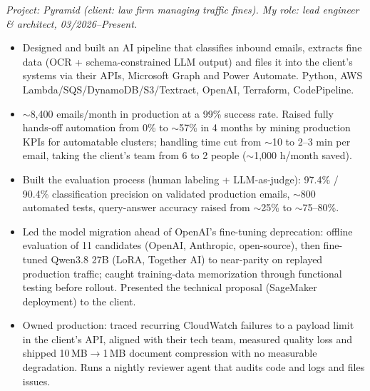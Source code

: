 \documentclass{article}
\begin{document}
\noindent\textit{Project: Pyramid (client: law firm managing traffic fines). My role: lead engineer \& architect, 03/2026--Present.}
\begin{itemize}
    \item Designed and built an AI pipeline that classifies inbound emails, extracts fine data (OCR + schema-constrained LLM output) and files it into the client's systems via their APIs, Microsoft Graph and Power Automate. Python, AWS Lambda/SQS/DynamoDB/S3/Textract, OpenAI, Terraform, CodePipeline.
    \item $\sim$8,400 emails/month in production at a 99\% success rate. Raised fully hands-off automation from 0\% to $\sim$57\% in 4 months by mining production KPIs for automatable clusters; handling time cut from $\sim$10 to 2--3 min per email, taking the client's team from 6 to 2 people ($\sim$1,000 h/month saved).
    \item Built the evaluation process (human labeling + LLM-as-judge): 97.4\% / 90.4\% classification precision on validated production emails, $\sim$800 automated tests, query-answer accuracy raised from $\sim$25\% to $\sim$75--80\%.
    \item Led the model migration ahead of OpenAI's fine-tuning deprecation: offline evaluation of 11 candidates (OpenAI, Anthropic, open-source), then fine-tuned Qwen3.8 27B (LoRA, Together AI) to near-parity on replayed production traffic; caught training-data memorization through functional testing before rollout. Presented the technical proposal (SageMaker deployment) to the client.
    \item Owned production: traced recurring CloudWatch failures to a payload limit in the client's API, aligned with their tech team, measured quality loss and shipped 10\,MB$\rightarrow$1\,MB document compression with no measurable degradation. Runs a nightly reviewer agent that audits code and logs and files issues.
\end{itemize}
\end{document}
